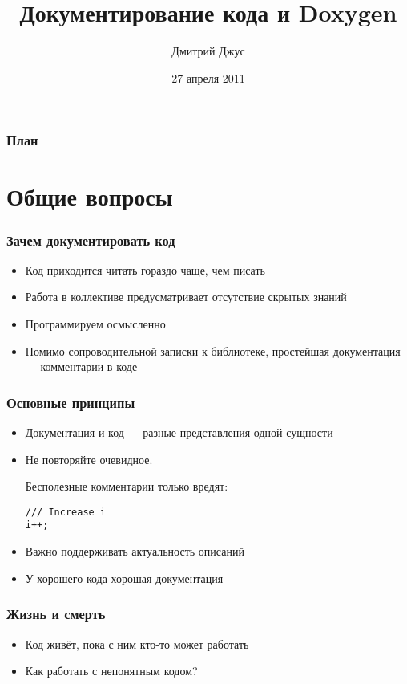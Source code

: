 \documentclass[onlymath]{beamer}
\title{Документирование кода и Doxygen}
\author{Дмитрий Джус}
\institute{АК-101}
\date{27 апреля 2011}
\begin{document}
\begin{frame}
  \titlepage
\end{frame}

\begin{frame}
  \frametitle{План}
  \tableofcontents
\end{frame}

\section{Общие вопросы}

\begin{frame}[fragile]
  \frametitle{Зачем документировать код}
  \begin{itemize}
  \item Код приходится читать гораздо чаще, чем писать

  \item Работа в коллективе предусматривает отсутствие скрытых знаний

  \item Программируем осмысленно

  \item Помимо сопроводительной записки к библиотеке, простейшая
    документация — комментарии в коде
  \end{itemize}
\end{frame}

\begin{frame}[fragile]
  \frametitle{Основные принципы}
  \begin{itemize}
  \item Документация и код — разные представления одной сущности

  \item Не повторяйте очевидное.

    Бесполезные комментарии только вредят:
\begin{lstlisting}
/// Increase i
i++;
\end{lstlisting}
    
  \item Важно поддерживать актуальность описаний

  \item У хорошего кода хорошая документация
  \end{itemize}
\end{frame}

\begin{frame}
  \frametitle{Жизнь и смерть}
  \begin{itemize}
  \item Код живёт, пока с ним кто-то может работать
  \item Как работать с непонятным кодом?
  \end{itemize}
\end{frame}
\end{document}
